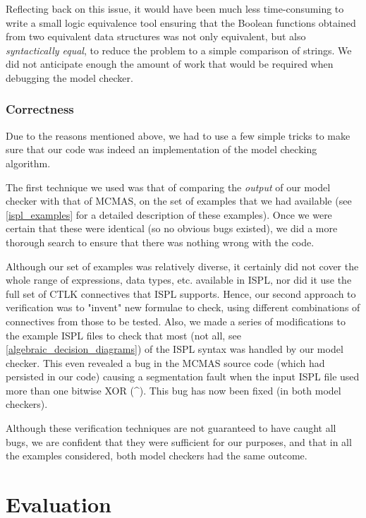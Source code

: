 \documentclass[11pt]{report}
\begin{document}
Reflecting back on this issue, it would have been much less time-consuming to write a small logic equivalence tool ensuring that the Boolean functions obtained from two equivalent data structures was not only equivalent, but also \textit{syntactically equal}, to reduce the problem to a simple comparison of strings. We did not anticipate enough the amount of work that would be required when debugging the model checker.

\subsection{Correctness}

 Due to the reasons mentioned above, we had to use a few simple tricks to make sure that our code was indeed an implementation of the model checking algorithm. 

The first technique we used was that of comparing the \textit{output} of our model checker with that of MCMAS, on the set of examples that we had available (see \ref{ispl_examples} for a detailed description of these examples). Once we were certain that these were identical (so no obvious bugs existed), we did a more thorough search to ensure that there was nothing wrong with the code. 

Although our set of examples was relatively diverse, it certainly did not cover the whole range of expressions, data types, etc. available in ISPL, nor did it use the full set of CTLK connectives that ISPL supports.
Hence, our second approach to verification was to "invent" new formulae to check, using different combinations of connectives from those to be tested. Also, we made a series of modifications to the example ISPL files to check that most (not all, see \ref{algebraic_decision_diagrams}) of the ISPL syntax was handled by our model checker. This even revealed a bug in the MCMAS source code (which had persisted in our code) causing a segmentation fault when the input ISPL file used more than one bitwise XOR (\^{}). This bug has now been fixed (in both model checkers).

Although these verification techniques are not guaranteed to have caught all bugs, we are confident that they were sufficient for our purposes, and that in all the examples considered, both model checkers had the same outcome.


\chapter{Evaluation} 
\end{document}
